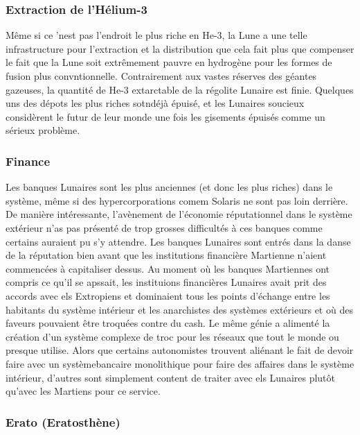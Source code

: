 \subsubsection{Extraction de l'Hélium-3} \label{sec:helium-3-mining} 

Même si ce 'nest pas l'endroit le plus riche en He-3, la Lune a une telle infrastructure pour l'extraction et la distribution que cela fait plus que compenser le fait que la Lune soit extrêmement pauvre en hydrogène pour les formes de fusion plus convntionnelle. Contrairement aux vastes réserves des géantes gazeuses, la quantité de He-3 extarctable de la régolite Lunaire est finie. Quelques uns des dépots les plus riches sotndéjà épuisé, et les Lunaires soucieux considèrent le futur de leur monde une fois les gisements épuisés comme un sérieux problème. 

\subsubsection{Finance} \label{sec:finance} 

Les banques Lunaires sont les plus anciennes (et donc les plus riches) dans le système, même si des hypercorporations comem Solaris ne sont pas loin derrière. De manière intéressante, l'avènement de l'économie réputationnel dans le système extérieur n'as pas présenté de trop grosses difficultés à ces banques comme certains auraient pu s'y attendre. Les banques Lunaires sont entrés dans la danse de la réputation bien avant que les institutions financière Martienne n'aient commencées à capitaliser dessus. Au moment où les banques Martiennes ont compris ce qu'il se apssait, les instituions financières Lunaires avait prit des accords avec els Extropiens et dominaient tous les points d'échange entre les habitants du système intérieur et les anarchistes des systèmes extérieurs et où des faveurs pouvaient être troquées contre du cash. Le même génie a alimenté la création d'un système complexe de troc pour les réseaux que tout le monde ou presque utilise. Alors que certains autonomistes trouvent aliénant le fait de devoir faire avec un systèmebancaire monolithique pour faire des affaires dans le système intérieur, d'autres sont simplement content de traiter avec els Lunaires plutôt qu'avec les Martiens pour ce service. 

\subsubsection{Erato (Eratosthène)} \label{sec:erato-eratosthenes} 

